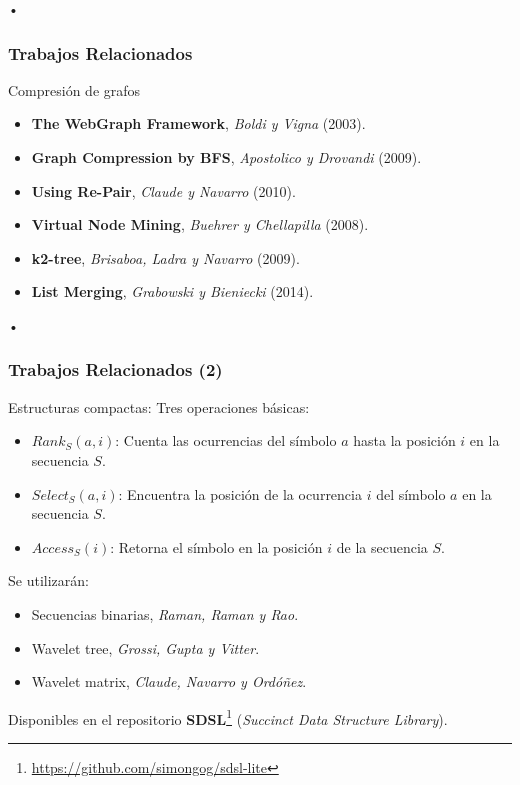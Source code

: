 \begin{frame}{•}
\frametitle{Trabajos Relacionados}

Compresión de grafos

\begin{itemize}
	\item \textbf{The WebGraph Framework}, {\footnotesize \textit{Boldi y Vigna} (2003)}.
	\item \textbf{Graph Compression by BFS}, {\footnotesize \textit{Apostolico y Drovandi} (2009)}.
	\item \textbf{Using Re-Pair}, {\footnotesize \textit{Claude y Navarro} (2010)}.
	\item \textbf{Virtual Node Mining}, {\footnotesize \textit{Buehrer y Chellapilla} (2008)}.
	\item \textbf{k2-tree}, {\footnotesize \textit{Brisaboa, Ladra y Navarro} (2009)}.
	\item \textbf{List Merging}, {\footnotesize \textit{Grabowski y Bieniecki} (2014)}.
\end{itemize}

\end{frame}



\begin{frame}{•}
\frametitle{Trabajos Relacionados (2)}

Estructuras compactas: Tres operaciones básicas:

\begin{itemize}
	\item \textbf{$Rank_{S}(a, i)$}: Cuenta las ocurrencias del símbolo $a$ hasta la posición $i$ en la secuencia $S$.
	\item \textbf{$Select_{S}(a, i)$}: Encuentra la posición de la ocurrencia $i$ del símbolo $a$ en la secuencia $S$.
	\item \textbf{$Access_{S}(i)$}: Retorna el símbolo en la posición $i$ de la secuencia $S$.
\end{itemize}

Se utilizarán:
\begin{itemize}
	\item Secuencias binarias, {\footnotesize \textit{Raman, Raman y Rao}}.
	\item Wavelet tree, {\footnotesize \textit{Grossi, Gupta y Vitter}}.
	\item Wavelet matrix, {\footnotesize \textit{Claude, Navarro y Ordóñez}}.
\end{itemize}

Disponibles en el repositorio \textbf{SDSL}\footnote{\url{https://github.com/simongog/sdsl-lite}} (\textit{Succinct Data Structure Library}).

\end{frame}



